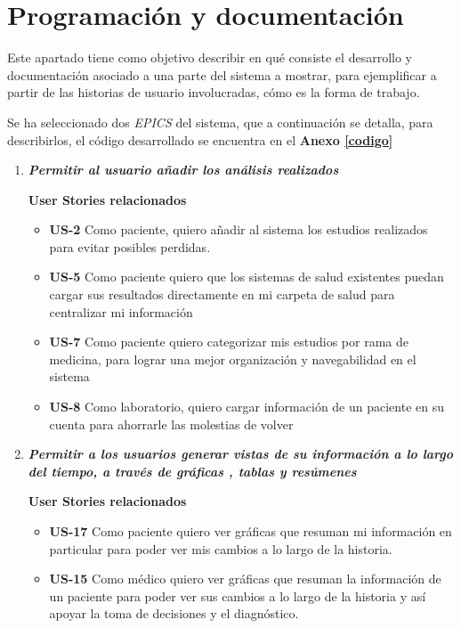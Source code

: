 \section{Programación y documentación}
Este apartado tiene como objetivo describir en qué consiste el desarrollo y documentación asociado a una parte del sistema a mostrar, para ejemplificar a partir de las historias de usuario involucradas, cómo es la forma de trabajo.
	

Se ha seleccionado dos \textit{EPICS} del sistema, que a continuación se detalla, para describirlos, el código desarrollado se encuentra en el \textbf{Anexo \ref{codigo}}
\begin{enumerate}
\item \textit{\textbf{Permitir al usuario añadir los análisis realizados }}

\textbf{User Stories relacionados}
    \begin{itemize}
        \item \textbf{US-2 }Como paciente, quiero añadir al sistema los estudios realizados para evitar posibles perdidas.
        \item \textbf{US-5 }Como paciente quiero que los sistemas de salud existentes puedan cargar sus resultados directamente en mi carpeta de salud para centralizar mi información
        \item  \textbf{US-7} Como paciente quiero categorizar mis estudios por rama de medicina, para lograr una mejor organización y navegabilidad en el sistema
        \item \textbf{US-8} Como laboratorio, quiero cargar información de un paciente en su cuenta para ahorrarle las molestias de volver
    \end{itemize}
\item \textbf{\textit{Permitir a los usuarios generar vistas de su información a lo largo del tiempo, a través de gráficas , tablas y resúmenes }}

\textbf{User Stories relacionados}
    \begin{itemize}
        \item \textbf{US-17} Como paciente quiero ver gráficas que resuman mi información en particular para poder ver mis cambios a lo largo de la historia.
        \item \textbf{US-15} Como médico quiero ver gráficas que resuman la información de un paciente para poder ver sus cambios a lo largo de la historia y así apoyar la toma de decisiones y el diagnóstico.
    \end{itemize}
\end{enumerate}

